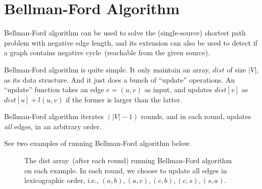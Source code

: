 \setcounter{definition}{0} \setcounter{property}{0} \setcounter{claim}{0} \setcounter{fact}{0} \setcounter{corollary}{0} \setcounter{figure}{0}
\section{Bellman-Ford Algorithm}

Bellman-Ford algorithm can be used to solve the (single-source) shortest path problem with negative edge length,
and its extension can also be used to detect if a graph contains negative cycle~(reachable from the given source).

Bellman-Ford algorithm is quite simple. It only maintain an array, 
$dist$ of size $|V|$, as its data structure. And it just does a bunch of ``update'' operations.
An ``update'' function takes an edge $e = (u,v)$ as input, and updates $dist[v]$ as $dist[u] + l(u,v)$ if
the former is larger than the latter.  

\begin{algorithmblock}[0.8\textwidth]
	\xxx
	\xxx
	\xxx
\end{algorithmblock}


Bellman-Ford algorithm iterates $(|V| - 1)$ rounds, and in each round, updates \emph{all} edges, in an arbitrary order.

\begin{algorithmblock}[0.8\textwidth]
	\xxx
	\xxx
	\xxx
	\xxx
	\xxx
	\xxx
\end{algorithmblock}


See two examples of running Bellman-Ford algorithm below.

\begin{figure}[h]
\centering{}
\caption{The dist array~(after each round) running Bellman-Ford algorithm on each example.
In each round, we choose to update all edges in lexicographic order, i.e., $(a,b), (a,c), (c,b),(c,s),(s,a)$.}
\end{figure}


